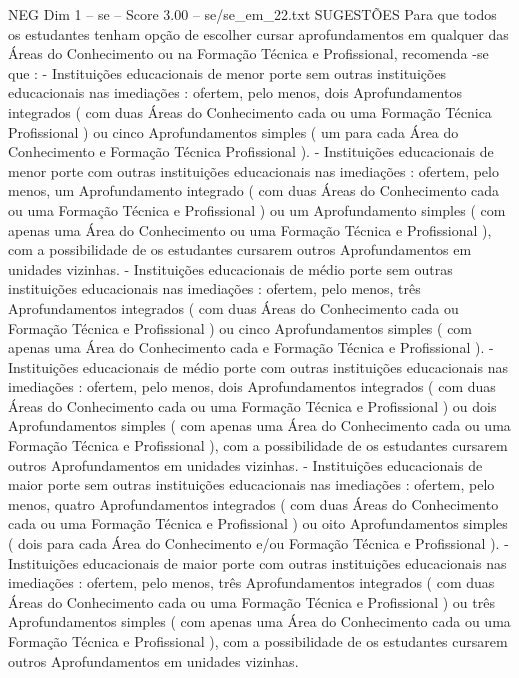 \begin{textsample}{NEG Dim 1 – se – Score 3.00 – se/se\_em\_22.txt}  \label{ex:f1_neg_201}
SUGESTÕES Para que todos os estudantes tenham opção de escolher cursar aprofundamentos em qualquer das Áreas do Conhecimento ou na Formação Técnica e Profissional, recomenda -se que : - Instituições educacionais de menor porte sem outras instituições educacionais nas imediações : ofertem, pelo menos, dois Aprofundamentos integrados ( com duas Áreas do Conhecimento cada ou uma Formação Técnica Profissional ) ou cinco Aprofundamentos simples ( um para cada Área do Conhecimento e Formação Técnica Profissional ). - Instituições educacionais de menor porte com outras instituições educacionais nas imediações : ofertem, pelo menos, um Aprofundamento integrado ( com duas Áreas do Conhecimento cada ou uma Formação Técnica e Profissional ) ou um Aprofundamento simples ( com apenas uma Área do Conhecimento ou uma Formação Técnica e Profissional ), com a possibilidade de os estudantes cursarem outros Aprofundamentos em unidades vizinhas. - Instituições educacionais de médio porte sem outras instituições educacionais nas imediações : ofertem, pelo menos, três Aprofundamentos integrados ( com duas Áreas do Conhecimento cada ou Formação Técnica e Profissional ) ou cinco Aprofundamentos simples ( com apenas uma Área do Conhecimento cada e Formação Técnica e Profissional ). - Instituições educacionais de médio porte com outras instituições educacionais nas imediações : ofertem, pelo menos, dois Aprofundamentos integrados ( com duas Áreas do Conhecimento cada ou uma Formação Técnica e Profissional ) ou dois Aprofundamentos simples ( com apenas uma Área do Conhecimento cada ou uma Formação Técnica e Profissional ), com a possibilidade de os estudantes cursarem outros Aprofundamentos em unidades vizinhas. - Instituições educacionais de maior porte sem outras instituições educacionais nas imediações : ofertem, pelo menos, quatro Aprofundamentos integrados ( com duas Áreas do Conhecimento cada ou uma Formação Técnica e Profissional ) ou oito Aprofundamentos simples ( dois para cada Área do Conhecimento e/ou Formação Técnica e Profissional ). - Instituições educacionais de maior porte com outras instituições educacionais nas imediações : ofertem, pelo menos, três Aprofundamentos integrados ( com duas Áreas do Conhecimento cada ou uma Formação Técnica e Profissional ) ou três Aprofundamentos simples ( com apenas uma Área do Conhecimento cada ou uma Formação Técnica e Profissional ), com a possibilidade de os estudantes cursarem outros Aprofundamentos em unidades vizinhas.

\end{textsample}
